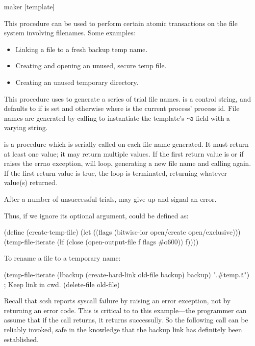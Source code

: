  {maker [template]} {\object\+}                     
 \str
\begin{desc}
    This procedure can be used to perform certain atomic transactions on
    the file system involving filenames. Some examples:
    \begin{itemize}
        \item Linking a file to a fresh backup temp name.
        \item Creating and opening an unused, secure temp file.
        \item Creating an unused temporary directory.
    \end{itemize}
    
    This procedure uses  to generate a series of trial
    file names.   is a  control string, and
    defaults to  if \TMPDIR{} is set
    and  otherwise where  is
    the current process' process id.  File names are generated by
    calling  to instantiate the template's \verb|~a| field
    with a varying string.

     is a procedure which is serially called on each file name
    generated.  It must return at least one value; it may return multiple
    values. If the first return value is {\sharpf} or if  raises the
     errno exception,  will loop,
    generating a new file name and calling  again. If the first
    return value is true, the loop is terminated, returning whatever value(s)
     returned.

    After a number of unsuccessful trials,  may give up
    and signal an error.

    Thus, if we ignore its optional  argument, 
     could be defined as:
\begin{code}
(define (create-temp-file)
  (let ((flags (bitwise-ior open/create open/exclusive)))
    (temp-file-iterate 
        (\l{f} 
          (close (open-output-file f flags #o600))
          f))))\end{code}

    To rename a file to a temporary name:
\begin{code}
(temp-file-iterate (\l{backup}
                     (create-hard-link old-file backup)
                     backup)
                   ".#temp.\~a") ; Keep link in cwd.
(delete-file old-file)\end{code}
    Recall that scsh reports syscall failure by raising an error
    exception, not by returning an error code. This is critical to
    to this example---the programmer can assume that if the 
     call returns, it returns successully.
    So the following  call can be reliably invoked,
    safe in the knowledge that the backup link has definitely been established.


\end{desc}
